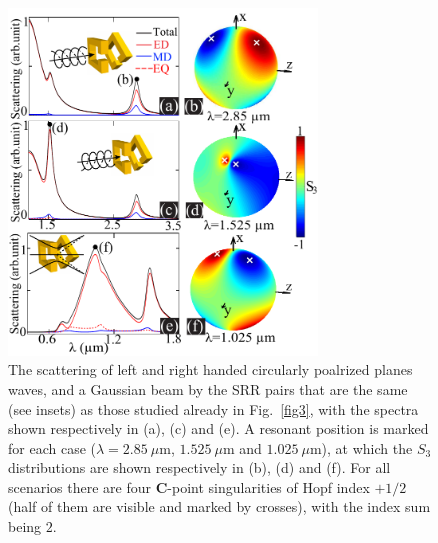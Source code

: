 \documentclass[aps,twocolumn,superscriptaddress]{revtex4-1}
\newcounter{Fig}
\begin{document}
%
\begin{figure}[tp]
\centerline{\includegraphics[width=8.2cm]{figure4}} \caption{\small The scattering of left and right handed circularly poalrized planes waves, and a Gaussian beam by the SRR pairs that are the same (see insets) as those studied already in Fig.~\ref{fig3}, with the spectra shown respectively in (a), (c) and (e). A resonant position is marked for each case ($\lambda=2.85~\mu$m, $1.525~\mu$m and $1.025~\mu$m), at which the $S_3$ distributions are shown respectively in (b), (d) and (f). For all scenarios there are four \textbf{C}-point singularities of Hopf index $+1/2$ (half of them are visible and marked by crosses), with the index sum being $2$.}
\label{fig4}
\end{figure}
%
\end{document}

